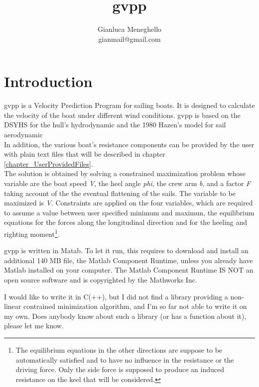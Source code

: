\documentclass[a4paper,openany]{memoir}
\begin{document}
\title{gvpp}
\author{Gianluca Meneghello \\ \small{gianmail@gmail.com}}
%
\maketitle
\tableofcontents

\newpage


\chapter{Introduction}
\label{chapter_Introduction}

gvpp is a Velocity Prediction Program for sailing boats. It is designed to calculate the velocity of the boat under different wind conditions.
gvpp is based on the DSYHS for the hull's hydrodynamic \cite{DSYHS} and the 1980 Hazen's model for sail aerodynamic \cite{PYD}\\
In addition, the various boat's resistance components can be provided by the user with plain text files that will be described in chapter \ref{chapter_UserProvidedFiles}.\\
The solution is obtained by solving a constrained maximization problem whose variable are the boat speed \textit{V}, the heel angle \textit{phi}, the crew arm \textit{b}, and a factor \textit{F} taking account of the the eventual flattening of the sails. The variable to be maximized is \textit{V}.
Constraints are applied on the four variables, which are required to assume a value between user specified minimum and maximun, the equilibrium equations for the forces along the longitudinal direction and for the heeling and righting moment\footnote{The equilibrium equations in the other directions are suppose to be automatically satisfied and to have no influence in the resistance or the driving force. Only the side force is supposed to produce an induced resistance on the keel that will be considered.}.

gvpp is written in Matab. To let it run, this requires to download and install an additional 140 MB file, the Matlab Component Runtime, unless you already have Matlab installed on your computer. The Matlab Component Runtime IS NOT an open source software and is copyrighted by the Mathworks Inc.

I would like to write it in C(++), but I did not find a library providing a non-linear contrained minimization algorithm, and I'm so far not able to write it on my own. Does anybody know about such a library (or has a function about it), please let me know.
\end{document}
